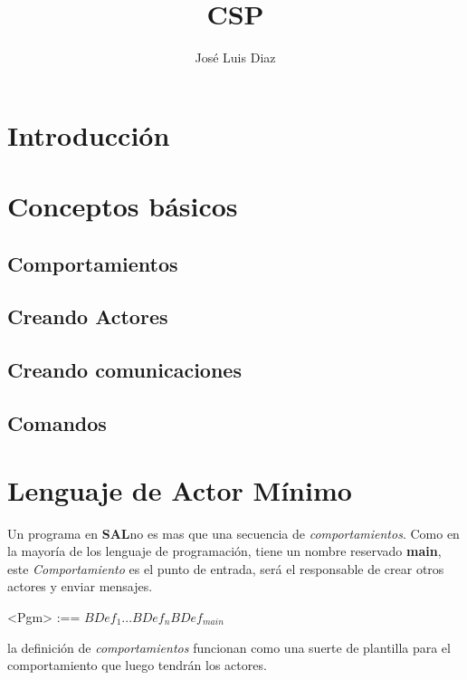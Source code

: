 \documentclass[fleqn]{article}
\title{CSP}
\author{José Luis Diaz}
\date{ }
\newcommand{\SAL}{\textbf{SAL}}
\begin{document}
 
\maketitle
 
\tableofcontents
 
\section{Introducción}

\section{Conceptos básicos}

\subsection{Comportamientos} \label{comportamientos}

\subsection{Creando Actores}

\subsection{Creando comunicaciones}

\subsection{Comandos}

\section{Lenguaje de Actor Mínimo}

Un programa en \SAL no es mas que una secuencia de \textit{comportamientos}.
Como en la mayoría de los lenguaje de programación, tiene un nombre reservado
\textbf{main}, este \textit{Comportamiento} es el punto de entrada, será el
responsable de crear otros actores y enviar mensajes.

\begin{grammar}
   <Pgm> :== $BDef_1 ... BDef_n BDef_{main} $ 
\end{grammar}

la definición de \textit{comportamientos} funcionan como una suerte de plantilla
para el comportamiento que luego tendrán los actores. 
\end{document}

